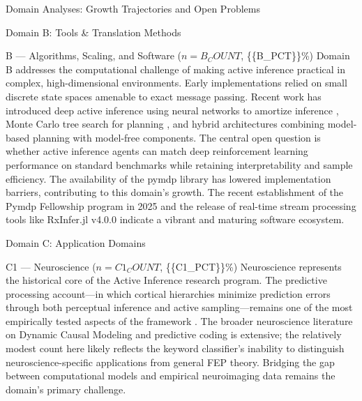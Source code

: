 \documentclass[
  ignorenonframetext,
]{beamer}
\begin{document}
\begin{frame}{Domain Analyses: Growth Trajectories and Open Problems
\label{sec:subfield_analyses}}
\begin{block}{Domain B: Tools \& Translation Methods}
\protect{}\label{domain-b-tools-translation-methods}
\begin{block}{B --- Algorithms, Scaling, and Software
(\(n = {{B_COUNT}}\), \{\{B\_PCT\}\}\%)}
\protect{}\label{b-algorithms-scaling-and-software-n-b_count-b_pct}
Domain B addresses the computational challenge of making active
inference practical in complex, high-dimensional environments. Early
implementations relied on small discrete state spaces amenable to exact
message passing. Recent work has introduced deep active inference using
neural networks to amortize inference \citep{fountas2020deep}, Monte
Carlo tree search for planning \citep{champion2021realizing}, and hybrid
architectures combining model-based planning with model-free components.
The central open question is whether active inference agents can match
deep reinforcement learning performance on standard benchmarks while
retaining interpretability and sample efficiency. The availability of
the pymdp library \citep{heins2022pymdp} has lowered implementation
barriers, contributing to this domain's growth. The recent establishment
of the Pymdp Fellowship program in 2025 and the release of real-time
stream processing tools like RxInfer.jl v4.0.0 \citep{rxinfer2025}
indicate a vibrant and maturing software ecosystem.
\end{block}
\end{block}

\begin{block}{Domain C: Application Domains}
\protect{}\label{domain-c-application-domains}
\begin{block}{C1 --- Neuroscience (\(n = {{C1_COUNT}}\),
\{\{C1\_PCT\}\}\%)}
\protect{}\label{c1-neuroscience-n-c1_count-c1_pct}
Neuroscience represents the historical core of the Active Inference
research program. The predictive processing account---in which cortical
hierarchies minimize prediction errors through both perceptual inference
and active sampling---remains one of the most empirically tested aspects
of the framework \citep{friston2010free, clark2013whatever}. The broader
neuroscience literature on Dynamic Causal Modeling and predictive coding
is extensive; the relatively modest count here likely reflects the
keyword classifier's inability to distinguish neuroscience-specific
applications from general FEP theory. Bridging the gap between
computational models and empirical neuroimaging data remains the
domain's primary challenge.
\end{block}


\end{block}
\end{frame}
\end{document}
